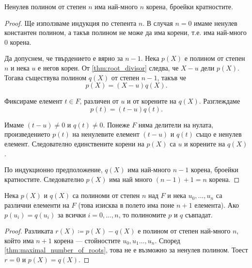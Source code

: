 \documentclass{../../common/topic}
\begin{document}
\begin{lemma}\label{thm:maximal_number_of_roots}
  Ненулев полином от степен \( n \) има най-много \( n \) корена, броейки кратностите.
\end{lemma}
\begin{proof}
  Ще използваме индукция по степента \( n \). В случая \( n = 0 \) имаме ненулев константен полином, а такъв полином не може да има корени, т.е. има най-много \( 0 \) корена.

  Да допуснем, че твърдението е вярно за \( n - 1 \). Нека \( p(X) \) е полином от степен \( n \) и нека \( u \) е негов корен. От \cref{thm:root_divisor} следва, че \( X - u \) дели \( p(X) \). Тогава съществува полином \( q(X) \) от степен \( n - 1 \), такъв че
  \begin{equation*}
    p(X) = (X - u) q(X).
  \end{equation*}

  Фиксираме елемент \( t \in F \), различен от \( u \) и от корените на \( q(X) \). Разглеждаме
  \begin{equation*}
    p(t) = (t - u) q(t).
  \end{equation*}

  Имаме \( (t - u) \neq 0 \) и \( q(t) \neq 0 \). Понеже \( F \) няма делители на нулата, произведението \( p(t) \) на ненулевите елемент \( (t - u) \) и \( q(t) \) също е ненулев елемент. Следователно единствените корени на \( p(X) \) са \( u \) и корените на \( q(X) \).

  По индукционно предположение, \( q(X) \) има най-много \( n - 1 \) корена, броейки кратностите. Следователно \( p(X) \) има най много \( (n - 1) + 1 = n \) корена.
\end{proof}

\begin{theorem}\label{thm:coefficient_comparison_principle}
  Нека \( p(X) \) и \( q(X) \) са полиноми от степен \( n \) над \( F \) и нека \( u_0, \ldots, u_n \) са различни елементи на \( F \) (това изисква в полето има поне \( n+1 \) елемента). Ако \( p(u_i) = q(u_i) \) за всички \( i = 0, \ldots, n \), то полиномите \( p \) и \( q \) съвпадат.
\end{theorem}
\begin{proof}
  Разликата \( r(X) \coloneqq p(X) - q(X) \) е полином от степен най-много \( n \), който има \( n + 1 \) корена --- стойностите \( u_0, u_1 \ldots, u_n \). Според \cref{thm:maximal_number_of_roots}, това не е възможно за ненулев полином. Тоест \( r = 0 \) и \( p(X) = q(X) \).
\end{proof}
\end{document}
